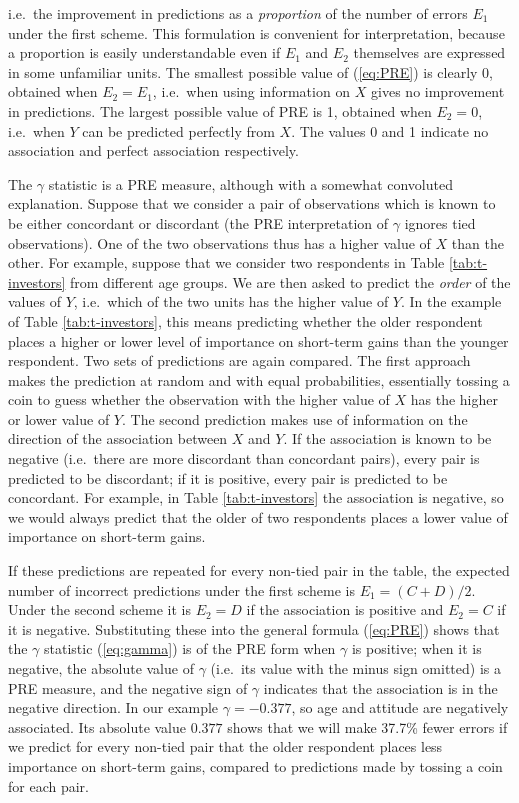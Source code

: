 \documentclass[11pt,a4paper,openany]{book}
\begin{document}
i.e.~the improvement in predictions as a \emph{proportion} of the number
of errors \(E_{1}\) under the first scheme. This formulation is
convenient for interpretation, because a proportion is easily
understandable even if \(E_{1}\) and \(E_{2}\) themselves are expressed
in some unfamiliar units. The smallest possible value of (\ref{eq:PRE})
is clearly 0, obtained when \(E_{2}=E_{1}\), i.e.~when using information
on \(X\) gives no improvement in predictions. The largest possible value
of PRE is 1, obtained when \(E_{2}=0\), i.e.~when \(Y\) can be predicted
perfectly from \(X\). The values 0 and 1 indicate no association and
perfect association respectively.

The \(\gamma\) statistic is a PRE measure, although with a somewhat
convoluted explanation. Suppose that we consider a pair of observations
which is known to be either concordant or discordant (the PRE
interpretation of \(\gamma\) ignores tied observations). One of the two
observations thus has a higher value of \(X\) than the other. For
example, suppose that we consider two respondents in Table
\ref{tab:t-investors} from different age groups. We are then asked to
predict the \emph{order} of the values of \(Y\), i.e.~which of the two
units has the higher value of \(Y\). In the example of Table
\ref{tab:t-investors}, this means predicting whether the older
respondent places a higher or lower level of importance on short-term
gains than the younger respondent. Two sets of predictions are again
compared. The first approach makes the prediction at random and with
equal probabilities, essentially tossing a coin to guess whether the
observation with the higher value of \(X\) has the higher or lower value
of \(Y\). The second prediction makes use of information on the
direction of the association between \(X\) and \(Y\). If the association
is known to be negative (i.e.~there are more discordant than concordant
pairs), every pair is predicted to be discordant; if it is positive,
every pair is predicted to be concordant. For example, in Table
\ref{tab:t-investors} the association is negative, so we would always
predict that the older of two respondents places a lower value of
importance on short-term gains.

If these predictions are repeated for every non-tied pair in the table,
the expected number of incorrect predictions under the first scheme is
\(E_{1}=(C+D)/2\). Under the second scheme it is \(E_{2}=D\) if the
association is positive and \(E_{2}=C\) if it is negative. Substituting
these into the general formula (\ref{eq:PRE}) shows that the \(\gamma\)
statistic (\ref{eq:gamma}) is of the PRE form when \(\gamma\) is
positive; when it is negative, the absolute value of \(\gamma\)
(i.e.~its value with the minus sign omitted) is a PRE measure, and the
negative sign of \(\gamma\) indicates that the association is in the
negative direction. In our example \(\gamma=-0.377\), so age and
attitude are negatively associated. Its absolute value \(0.377\) shows
that we will make 37.7\% fewer errors if we predict for every non-tied
pair that the older respondent places less importance on short-term
gains, compared to predictions made by tossing a coin for each pair.
\end{document}
